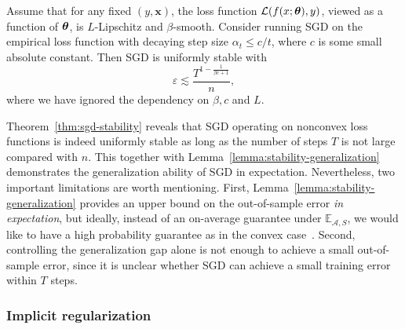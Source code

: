 \begin{thm}\label{thm:sgd-stability}Assume
that for any fixed $(y, \bm{x})$, the loss function $\mathcal{L}(f(x;\text{\boldmath $\theta$}), y)$, viewed as a function of $\text{\boldmath $\theta$}$,
is $L$-Lipschitz and $\beta$-smooth. Consider running SGD on the
empirical loss function with decaying step size $\alpha_{t}\leq c/t$,
where $c$ is some small absolute constant. Then SGD is uniformly
stable with
\[
\varepsilon\lesssim\frac{T^{1-\frac{1}{\beta c+1}}}{n},
\]
where we have ignored the dependency on $\beta,c$ and $L$. \end{thm}Theorem~\ref{thm:sgd-stability}
reveals that SGD operating on nonconvex loss functions is indeed uniformly
stable as long as the number of steps $T$ is not large compared with
$n$. This together with Lemma~\ref{lemma:stability-generalization}
demonstrates the generalization ability of SGD in expectation. %
Nevertheless, two important limitations are worth mentioning.  First, Lemma~\ref{lemma:stability-generalization} provides an upper bound on the out-of-sample error \emph{in expectation}, but ideally, instead of an on-average guarantee under $\mathbb{E}_{\mathcal{A},S}$, we would like to have a high probability guarantee as in the convex case~\citep{feldman2019high}.
Second, controlling the generalization gap alone is not enough to achieve a small out-of-sample error, since it is unclear whether SGD can achieve a small training error within $T$ steps.


\subsubsection{Implicit regularization} %

